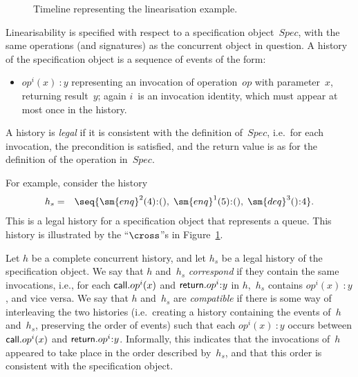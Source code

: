 
\begin{figure}
\unScalaMid
\def\X{node{$\cross$}}
\begin{center}
\end{center}
\caption{Timeline representing the linearisation example.}
\label{fig:lin-timeline}
\scalaMid
\end{figure}


Linearisability is specified with respect to a specification object~$Spec$,
with the same operations (and signatures) as the concurrent object in
question.  A history of the specification object is a sequence of events of
the form:
%
\begin{itemize}
\item $op^i(x)\::y$ representing an invocation of operation~$op$ with
  parameter~$x$, returning result~$y$; again $i$~is an invocation identity,
  which must appear at most once in the history.
\end{itemize}
%
A history is \emph{legal} if it is consistent with the definition of~$Spec$,
i.e.~for each invocation, the precondition is satisfied, and the return value
is as for the definition of the operation in~$Spec$.

For example, consider the history
\begin{eqnarray*}
h_s & = & \seq{\sm{enq}^2(4)\::(),\; \sm{enq}^1(5)\::(),\; \sm{deq}^3()\::4}.
\end{eqnarray*}
%
This is a legal history for a specification object that represents a queue.
This history is illustrated by the ``$\cross$''s in
Figure~\ref{fig:lin-timeline}.

Let $h$ be a complete concurrent history, and let $h_s$ be a legal history of
the specification object.  We say that $h$ and~$h_s$ \emph{correspond} if they
contain the same invocations, i.e., for each $\mathsf{call}.op^i(x)$ and
$\return.op^i\::y$ in $h$,\, $h_s$ contains $op^i(x)\::y$, and vice versa.  We
say that $h$ and~$h_s$ are \emph{compatible} if there is some way of
interleaving the two histories (i.e.~creating a history containing the events
of~$h$ and~$h_s$, preserving the order of events) such that each $op^i(x)\::y$
occurs between $\mathsf{call}.op^i(x)$ and $\return.op^i\::y$.  Informally, this
indicates that the invocations of~$h$ appeared to take place in the order
described by~$h_s$, and that this order is consistent with the specification
object.

